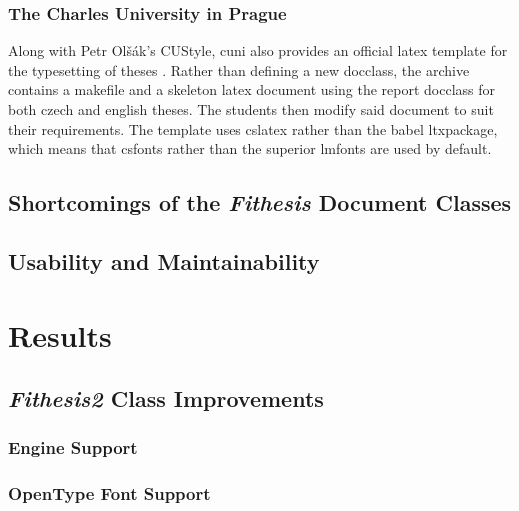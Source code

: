       \subsection{The Charles University in Prague}
      Along with Petr Olšák's CUStyle, \gls{cuni} also provides an official \gls{latex} template for the typesetting of theses \cite{cunisablona}. Rather than defining a new \gls{docclass}, the archive contains a \gls{makefile} and a skeleton \gls{latex} document using the report \gls{docclass} for both czech and english theses. The students then modify said document to suit their requirements. The template uses \gls{cslatex} rather than the babel \gls{ltxpackage}, which means that \gls{csfonts} rather than the superior \gls{lmfonts} \cite{cslatexvsbabel} are used by default.


    \section{Shortcomings of the \emph{Fithesis} Document Classes}
    \blindtext

    \section{Usability and Maintainability}
    \blindtext

  \chapter{Results}
    \blindtext

    \section{\emph{Fithesis2} Class Improvements}  
    \blindtext

      \subsection{ Engine Support} 
      \blindtext

      \subsection{OpenType Font Support} 
      \blindtext

